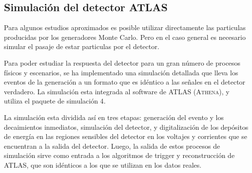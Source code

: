 



\subsection{Simulación del detector ATLAS}

Para algunos estudios aproximados es posible utilizar directamente las
particulas producidas por los generadores Monte Carlo. Pero en el caso general
es necesario simular el pasaje de estar particulas por el detector.

Para poder estudiar la respuesta del detector para un gran número de procesos
físicos y escenarios, se ha implementado una simulación detallada que lleva los
eventos de la generación a un formato que es idéntico a las señales en el
detector verdadero\cite{AtlasSim}. La simulación esta integrada al software de
ATLAS (\textsc{Athena}), y utiliza el paquete de simulación
{\geant}4\cite{Geant4}.

La simulación esta dividida así en tres etapas: generación del evento y los
decaimientos inmediatos, simulación del detector, y digitalización de
los depósitos de energía en las regiones sensibles del detector en los voltajes
y corrientes que se encuentran a la salida del detector. Luego, la salida de
estos procesos de simulación sirve como entrada a los algoritmos de
trigger y reconstrucción de ATLAS, que son idénticos a los que se utilizan en
los datos reales.

